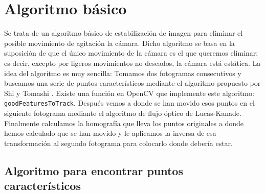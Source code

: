 \documentclass[a4paper,openright, 12pt]{book}
\begin{document}
\section{Algoritmo básico}
Se trata de un algoritmo básico de estabilización de imagen para eliminar el posible movimiento de agitación la cámara. Dicho algoritmo se basa en la suposición de que el único movimiento de la cámara es el que queremos eliminar; es decir, excepto por ligeros movimientos no deseados, la cámara está estática.
La idea del algoritmo es muy sencilla: 
Tomamos dos fotogramas consecutivos y buscamos una serie de puntos característicos mediante el algoritmo propuesto por Shi y Tomashi \cite{shiandtomasi}. Existe una función en OpenCV que implemente este algoritmo: \lstinline|goodFeaturesToTrack|. Después vemos a donde se han movido esos puntos en el siguiente fotograma mediante el algoritmo de flujo óptico de Lucas-Kanade\cite{LucasKanade}.
Finalmente calculamos la homografía que lleva los puntos originales a donde hemos calculado que se han movido y le aplicamos la inversa de esa transformación al segundo fotograma para colocarlo donde debería estar.
\subsection{Algoritmo para encontrar puntos característicos}
\end{document}

